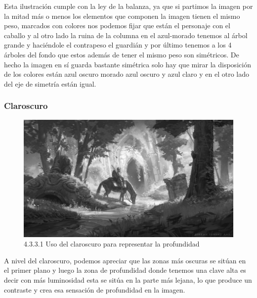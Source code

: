 \documentclass[12pt]{article}
\begin{document}
Esta ilustración cumple con la ley de la balanza, ya que si partimos la imagen por la mitad más o menos los elementos que componen la imagen tienen el mismo peso, marcados con colores nos podemos fijar que están el personaje con el caballo y al otro lado la ruina de la columna en el azul-morado tenemos al árbol grande y haciéndole el contrapeso el guardián y por último tenemos a los 4 árboles del fondo que estos además de tener el mismo peso son simétricos. De hecho la imagen en sí guarda bastante simétrica solo hay que mirar la disposición de los colores están azul oscuro morado azul oscuro y azul claro y en el otro lado del eje de simetría están igual.



        \subsubsection{Claroscuro}

        
    \begin{figure}[H]
      \centering
      \includegraphics[width=\textwidth]{images/Saúl/Sección 3/EA_img3_3Claroscuro_1Profundidad.png}
      \caption{\small 4.3.3.1 Uso del claroscuro para representar la profundidad}
    \end{figure}

A nivel del claroscuro, podemos apreciar que las zonas más oscuras se sitúan en el primer plano y luego la zona de profundidad donde tenemos una clave alta es decir con más luminosidad esta se sitúa en la parte más lejana, lo que produce un contraste y crea esa sensación de profundidad en la imagen.
\end{document}
